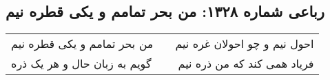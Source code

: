 \begin{center}
\section*{رباعی شماره ۱۳۲۸: من بحر تمامم و یکی قطره نیم}
\label{sec:1328}
\begin{longtable}{l p{0.5cm} r}
من بحر تمامم و یکی قطره نیم
&&
احول نیم و چو احولان غره نیم
\\
گویم به زبان حال و هر یک ذره
&&
فریاد همی کند که من ذره نیم
\\
\end{longtable}
\end{center}
